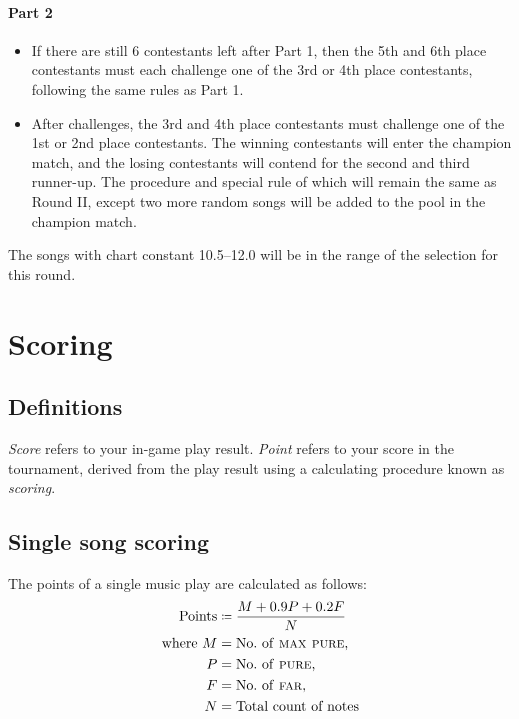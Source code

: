 \documentclass{article}
\newcommand{\alert}[1]{{\color{red} #1}}
\newcommand{\scoreformula}[1]{{\color{red} #1}}
\newcommand{\srbgcolor}{red!40}
\begin{document}
\paragraph{Part 2}

\begin{itemize}
	\item If there are still 6 contestants left after Part 1,
	      then the 5th and 6th place contestants must each challenge
	      one of the 3rd or 4th place contestants,
	      following the same rules as Part 1.

	\item After challenges, the 3rd and 4th place contestants
	      must challenge one of the 1st or 2nd place contestants.
	      The winning contestants will enter the champion match,
	      and the losing contestants will contend for the
	      second and third runner-up.
	      The procedure and \colorbox{\srbgcolor}{special rule} of which
	      will remain the same as Round II,
	      except two more random songs will be added
	      to the pool in the champion match.
\end{itemize}

\alert{
	The songs with chart constant 10.5--12.0
	will be in the range of the selection for this round.
}

\section{Scoring}

\subsection{Definitions}
\emph{Score} refers to your in-game play result.
\emph{Point} refers to your score in the tournament,  %
derived from the play result
using a calculating procedure known as \emph{scoring}.

\newcommand{\notestyle}[1]{\textsc{\lowercase {#1}}}
\newcommand\Points{\text{Points}}
\newcommand\MaxPure{\notestyle{Max Pure}}
\newcommand\Pure{\notestyle{Pure}}
\newcommand\Far{\notestyle{Far}}
\newcommand\Lost{\notestyle{Lost}}
\newcommand{\coloneq}{\mathrel{\resizebox{\widthof{$\mathord{=}$}}{\height}{ $\!\!\resizebox{1.2\width}{0.8\height}{\raisebox{0.23ex}{$\mathop{:}$}}\!\!=\!\!$ }}}

\subsection{Single song scoring}
The points of a single music play are calculated as follows:
\scoreformula{
	\begin{align*}
		\Points        & \coloneq \frac{M + 0.9P + 0.2F}{N} \\
		\text{where}~M & = \text{No.~of \MaxPure,}          \\
		P              & = \text{No.~of \Pure,}             \\
		F              & = \text{No.~of \Far,}              \\
		N              & = \text{Total count of notes}
	\end{align*}
}
\end{document}
